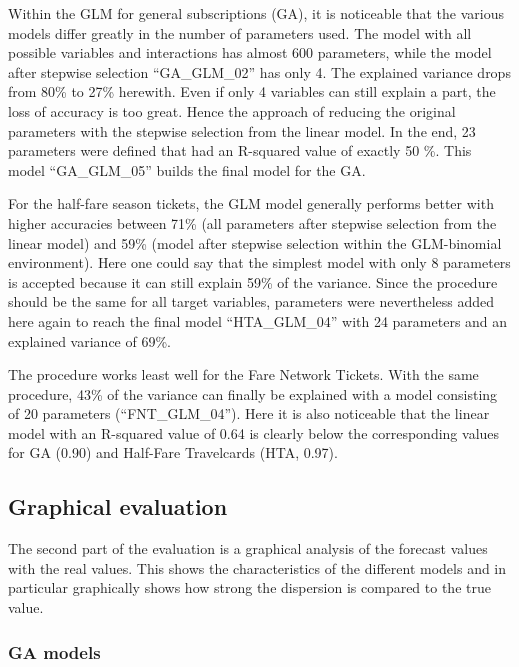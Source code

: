 \documentclass[
]{article}
\begin{document}
Within the GLM for general subscriptions (GA), it is noticeable that the
various models differ greatly in the number of parameters used. The
model with all possible variables and interactions has almost 600
parameters, while the model after stepwise selection ``GA\_GLM\_02'' has
only 4. The explained variance drops from 80\% to 27\% herewith. Even if
only 4 variables can still explain a part, the loss of accuracy is too
great. Hence the approach of reducing the original parameters with the
stepwise selection from the linear model. In the end, 23 parameters were
defined that had an R-squared value of exactly 50 \%. This model
``GA\_GLM\_05'' builds the final model for the GA.

For the half-fare season tickets, the GLM model generally performs
better with higher accuracies between 71\% (all parameters after
stepwise selection from the linear model) and 59\% (model after stepwise
selection within the GLM-binomial environment). Here one could say that
the simplest model with only 8 parameters is accepted because it can
still explain 59\% of the variance. Since the procedure should be the
same for all target variables, parameters were nevertheless added here
again to reach the final model ``HTA\_GLM\_04'' with 24 parameters and
an explained variance of 69\%.

The procedure works least well for the Fare Network Tickets. With the
same procedure, 43\% of the variance can finally be explained with a
model consisting of 20 parameters (``FNT\_GLM\_04''). Here it is also
noticeable that the linear model with an R-squared value of 0.64 is
clearly below the corresponding values for GA (0.90) and Half-Fare
Travelcards (HTA, 0.97).

\hypertarget{graphical-evaluation}{%
\subsection{Graphical evaluation}\label{graphical-evaluation}}

The second part of the evaluation is a graphical analysis of the
forecast values with the real values. This shows the characteristics of
the different models and in particular graphically shows how strong the
dispersion is compared to the true value.

\hypertarget{ga-models}{%
\subsubsection{GA models}\label{ga-models}}
\end{document}

